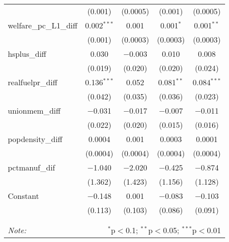 \begin{table}[!htbp]
\begin{tabular}{@{\extracolsep{5pt}}lcccc}
  & (0.001) & (0.0005) & (0.001) & (0.0005) \\ 
  welfare\_pc\_L1\_diff & 0.002$^{***}$ & 0.001 & 0.001$^{*}$ & 0.001$^{**}$ \\ 
  & (0.001) & (0.0003) & (0.0003) & (0.0003) \\ 
  hsplus\_diff & 0.030 & $-$0.003 & 0.010 & 0.008 \\ 
  & (0.019) & (0.020) & (0.020) & (0.024) \\ 
  realfuelpr\_diff & 0.136$^{***}$ & 0.052 & 0.081$^{**}$ & 0.084$^{***}$ \\ 
  & (0.042) & (0.035) & (0.036) & (0.023) \\ 
  unionmem\_diff & $-$0.031 & $-$0.017 & $-$0.007 & $-$0.011 \\ 
  & (0.022) & (0.020) & (0.015) & (0.016) \\ 
  popdensity\_diff & 0.0004 & 0.001 & 0.0003 & 0.0001 \\ 
  & (0.0004) & (0.0004) & (0.0004) & (0.0004) \\ 
  pctmanuf\_dif & $-$1.040 & $-$2.020 & $-$0.425 & $-$0.874 \\ 
  & (1.362) & (1.423) & (1.156) & (1.128) \\ 
  Constant & $-$0.148 & 0.001 & $-$0.083 & $-$0.103 \\ 
  & (0.113) & (0.103) & (0.086) & (0.091) \\ 
 \hline \\[-1.8ex] 
\hline 
\hline \\[-1.8ex] 
\textit{Note:}  & \multicolumn{4}{r}{$^{*}$p$<$0.1; $^{**}$p$<$0.05; $^{***}$p$<$0.01} \\ 
\end{tabular} 
\end{table} 
